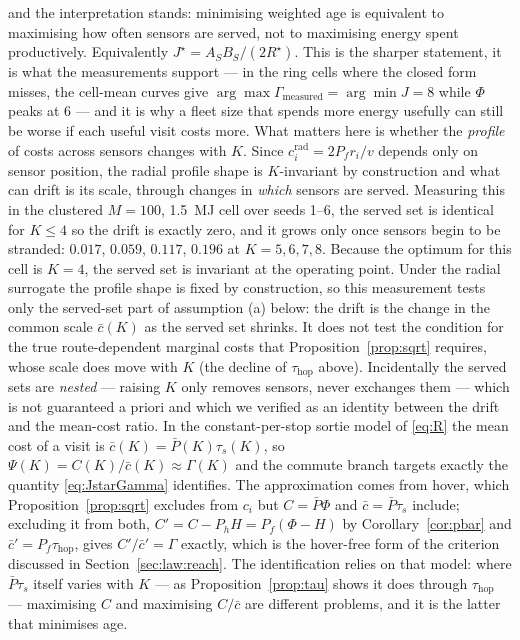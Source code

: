 \documentclass[journal,outdir=./]{IEEEtran}
\newcommand{\Pbar}{\bar{P}}
\newcommand{\Pf}{P_{f}}
\newcommand{\Ph}{P_{h}}
\newcommand{\Gam}{\Gamma}
\newcommand{\Psicap}{\Psi}
\begin{document}
and the interpretation stands: minimising weighted age is equivalent to maximising how often sensors are served, not to maximising energy spent productively. Equivalently $J^{\star}=A_SB_S/(2R^{\star})$. This is the sharper statement, it is what the measurements support --- in the ring cells where the closed form misses, the cell-mean curves give $\arg\max\Gam_{\mathrm{measured}}=\arg\min J=8$ while $\Phi$ peaks at 6 --- and it is why a fleet size that spends more energy usefully can still be worse if each useful visit costs more. What matters here is whether the \emph{profile} of costs across sensors changes with $K$. Since $c_i^{\mathrm{rad}}=2\Pf r_i/v$ depends only on sensor position, the radial profile shape is $K$-invariant by construction and what can drift is its scale, through changes in \emph{which} sensors are served. Measuring this in the clustered $M=100$, 1.5~MJ cell over seeds 1--6, the served set is identical for $K\le4$ so the drift is exactly zero, and it grows only once sensors begin to be stranded: $0.017$, $0.059$, $0.117$, $0.196$ at $K=5,6,7,8$. Because the optimum for this cell is $K=4$, the served set is invariant at the operating point. Under the radial surrogate the profile shape is fixed by construction, so this measurement tests only the served-set part of assumption (a) below: the drift is the change in the common scale $\bar c(K)$ as the served set shrinks. It does not test the condition for the true route-dependent marginal costs that Proposition~\ref{prop:sqrt} requires, whose scale does move with $K$ (the decline of $\tau_{\mathrm{hop}}$ above). Incidentally the served sets are \emph{nested} --- raising $K$ only removes sensors, never exchanges them --- which is not guaranteed a priori and which we verified as an identity between the drift and the mean-cost ratio. In the constant-per-stop sortie model of \eqref{eq:R} the mean cost of a visit is $\bar c(K)=\Pbar(K)\tau_s(K)$, so $\Psicap(K)=C(K)/\bar c(K)\approx\Gam(K)$ and the commute branch targets exactly the quantity \eqref{eq:JstarGamma} identifies. The approximation comes from hover, which Proposition~\ref{prop:sqrt} excludes from $c_i$ but $C=\Pbar\Phi$ and $\bar c=\Pbar\tau_s$ include; excluding it from both, $C'=C-\Ph H=\Pf(\Phi-H)$ by Corollary~\ref{cor:pbar} and $\bar c'=\Pf\tau_{\mathrm{hop}}$, gives $C'/\bar c'=\Gam$ exactly, which is the hover-free form of the criterion discussed in Section~\ref{sec:law:reach}. The identification relies on that model: where $\Pbar\tau_s$ itself varies with $K$ --- as Proposition~\ref{prop:tau} shows it does through $\tau_{\mathrm{hop}}$ --- maximising $C$ and maximising $C/\bar c$ are different problems, and it is the latter that minimises age.
\end{document}
